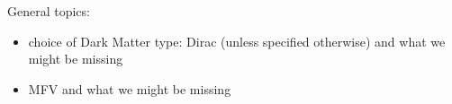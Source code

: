General topics:
\begin{itemize}
 \item choice of Dark Matter type: Dirac (unless specified otherwise) and what we might be missing
 \item MFV and what we might be missing
\end{itemize}
